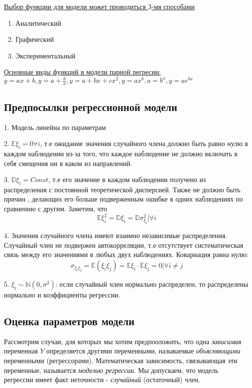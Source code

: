 \documentclass[aps,%
12pt,%
final,%
oneside,
onecolumn,%
musixtex, %
superscriptaddress,%
centertags]{article} %
\begin{document}
\underline{Выбор функции для модели может проводиться $3$-мя способами}
\begin{enumerate}
	\item Аналитический
	\item Графический
	\item Экспериментальный
\end{enumerate}

\underline{Основные виды функций в модели парной регресии:} \\ 
$y=ax+b, y=a+\frac{b}{x}, y=a+bx+cx^2,y=ax^b, a=b^x, y=ae^{bx} $
\subsection{Предпосылки регрессионной модели}
1. Модель линейна по параметрам

2. $\mathbb{E}\xi_i = 0 \forall i$, т.е ожидание значения случайного члена должно быть равно нулю в каждом наблюдении из-за того, что каждое наблюдение не должно включать в себя смещения ни в каком из направлений.

3. $\mathbb{D}\xi_i = Const $, т.е его значение в каждом наблюдении получено из распределения с постоянной теоретической дисперсией. Также не должно быть причин , делающих его больше подверженным ошибке в одних наблюдениях по сравнению с другим. Заметим, что $$\mathbb{E}\xi_i^2 = \mathbb{D}\xi_i = \mathbb{D}\sigma_{\xi_i}^2 | \forall i $$

4. Значения случайного члена имеют взаимно независимые распределения. Случайный член не подвержен автокорреляции, т.е отсутствует систематическая связь между его значениями в любых двух наблюдениях.
Ковариация равна нулю:
$$ \sigma_{\xi_{i}\xi_{j}} = \mathbb{E}(\xi_i\xi_j) = \mathbb{E}\xi_i \cdot \mathbb{E}\xi_j = 0 | \forall i \neq j $$

5. $\xi_i \sim \mathbb{N}(0,\sigma^2)$: если случайный член нормально распределен, то распределены нормально и коэффициенты регрессии.

\subsection{Оценка параметров модели}
Рассмотрим случаи, для которых мы хотим предпооложить, что одна \textit{зависимая} переменная $Y$ определяется другими переменными, называемые \textit{объясняющими} переменными (регрессорами). Математическая зависимость, связывающая эти переменные, называется \textit{моделью регрессии}. Мы допускаем, что модель регрессии имеет факт неточности - \textit{случайный} (остаточный) член.
\end{document}
